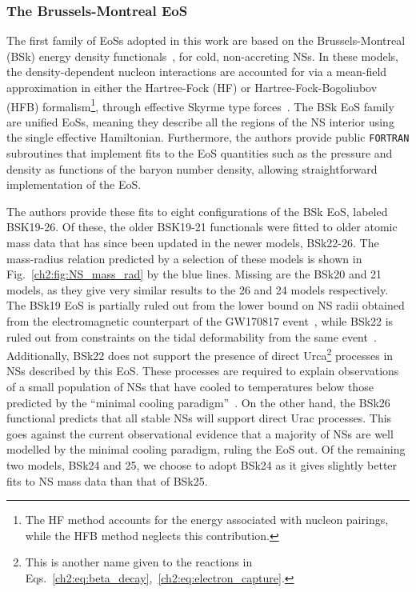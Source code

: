 \subsubsection{The Brussels-Montreal EoS}
The first family of EoSs adopted in this work are based on the Brussels-Montreal (BSk) energy density functionals~\cite{Chamel:2009yx_FurtherexplorationsSkyrmeHartreeFockBogoliubov, Goriely:2010bm_FurtherexplorationsSkyrmeHartreeFockBogoliubov, Pearson:2011zz_jun_Propertiesoutercrust, Pearson:2012hz_Innercrustneutron, Potekhin:2013qqa_Analyticalrepresentationsunified, Pearson:2018tkr_Unifiedequationsstate}, for cold, non-accreting NSs. In these models, the density-dependent nucleon interactions are accounted for via a mean-field approximation in either the Hartree-Fock (HF) or Hartree-Fock-Bogoliubov (HFB) formalism\footnote{The HF method accounts for the energy associated with nucleon pairings, while the HFB method neglects this contribution.}, through effective Skyrme type forces~\cite{Bender:2003jk_Selfconsistentmeanfieldmodels, Stone:2006fn_Skyrmeinteractionfinite}. The BSk EoS family are unified EoSs, meaning they describe all the regions of the NS interior using the single effective Hamiltonian. Furthermore, the authors provide public \texttt{FORTRAN} subroutines that implement fits to the EoS quantities such as the pressure and density as functions of the baryon number density, allowing straightforward implementation of the EoS. 

The authors provide these fits to eight configurations of the BSk EoS, labeled BSK19-26. Of these, the older BSK19-21  functionals were fitted to older atomic mass data that has since been updated in the newer models, BSk22-26. The mass-radius relation predicted by a selection of these models is shown in Fig.~\ref{ch2:fig:NS_mass_rad} by the blue lines. Missing are the BSk20 and 21 models, as they give very similar results to the 26 and 24 models respectively. The BSk19 EoS is partially ruled out from the lower bound on NS radii obtained from the electromagnetic counterpart of the GW170817 event~\cite{Koppel:2019pys_Generalrelativisticdeterminationthreshold}, while BSk22 is ruled out from constraints on the tidal deformability from the same event~\cite{Perot:2019gwl_Rolesymmetryenergy}. Additionally, BSk22 does not support the presence of direct Urca\footnote{This is another name given to the reactions in Eqs.~\ref{ch2:eq:beta_decay},~\ref{ch2:eq:electron_capture}.} processes in NSs described by this EoS. These processes are required to explain observations of a small population of NSs that have cooled to temperatures below those predicted by the ``minimal cooling paradigm''~\cite{Gusakov:2004se_Enhancedcoolingneutron, Page:2004fy_MinimalCoolingNeutron}. On the other hand, the BSk26 functional predicts that all stable NSs will support direct Urac processes. This goes against the current observational evidence that a majority of NSs are well modelled by the minimal cooling paradigm, ruling the EoS out. Of the remaining two models, BSk24 and 25, we choose to adopt BSk24 as it gives slightly better fits to NS mass data than that of BSk25. 

